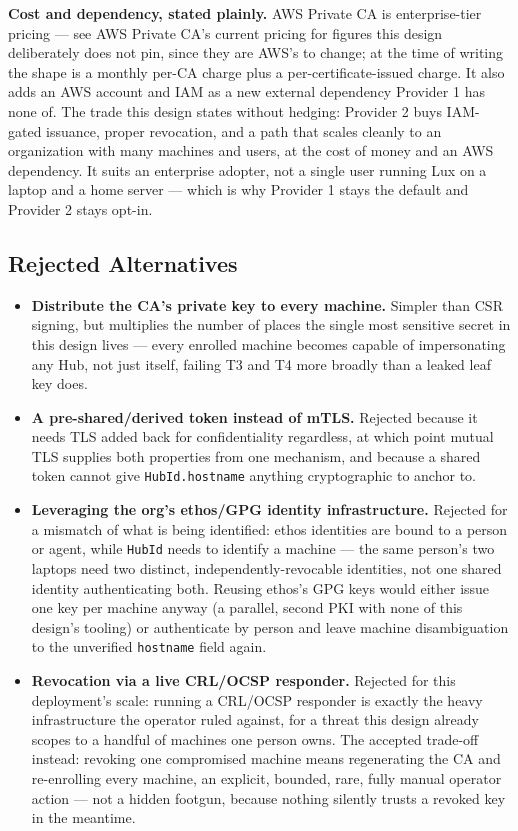 \documentclass[a4paper,10pt]{article}
\newcommand{\field}[1]{\texttt{#1}}
\begin{document}
\textbf{Cost and dependency, stated plainly.}  AWS Private CA is
enterprise-tier pricing --- see AWS Private CA's current pricing for
figures this design deliberately does not pin, since they are AWS's to
change; at the time of writing the shape is a monthly per-CA charge plus
a per-certificate-issued charge.  It also adds an AWS account and
IAM as a new external dependency Provider 1 has none of.  The
trade this design states without hedging: Provider 2 buys
IAM-gated issuance, proper revocation, and a path that scales
cleanly to an organization with many machines and users, at the cost of
money and an AWS dependency.  It suits an enterprise adopter, not a
single user running Lux on a laptop and a home server --- which is why
Provider 1 stays the default and Provider 2 stays opt-in.

\subsection{Rejected Alternatives}\label{sec:crosshost-rejected}

\begin{itemize}
  \item \textbf{Distribute the CA's private key to every machine.}
    Simpler than CSR signing, but multiplies the number of places the
    single most sensitive secret in this design lives --- every enrolled
    machine becomes capable of impersonating any Hub, not just itself,
    failing T3 and T4 more broadly than a leaked leaf key does.
  \item \textbf{A pre-shared/derived token instead of mTLS.}  Rejected
    because it needs TLS added back for confidentiality regardless, at
    which point mutual TLS supplies both properties from one mechanism,
    and because a shared token cannot give \field{HubId.hostname} anything
    cryptographic to anchor to.
  \item \textbf{Leveraging the org's ethos/GPG identity infrastructure.}
    Rejected for a mismatch of what is being identified: ethos identities
    are bound to a person or agent, while \texttt{HubId} needs to identify
    a machine --- the same person's two laptops need two distinct,
    independently-revocable identities, not one shared identity
    authenticating both.  Reusing ethos's GPG keys would either issue one
    key per machine anyway (a parallel, second PKI with none of this
    design's tooling) or authenticate by person and leave machine
    disambiguation to the unverified \field{hostname} field again.
  \item \textbf{Revocation via a live CRL/OCSP responder.}  Rejected for
    this deployment's scale: running a CRL/OCSP responder is exactly the
    heavy infrastructure the operator ruled against, for a threat this
    design already scopes to a handful of machines one person owns.  The
    accepted trade-off instead: revoking one compromised machine means
    regenerating the CA and re-enrolling every machine, an explicit,
    bounded, rare, fully manual operator action --- not a hidden footgun,
    because nothing silently trusts a revoked key in the meantime.
\end{itemize}
\end{document}
